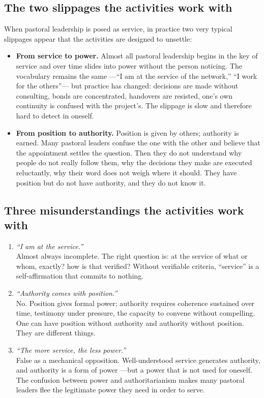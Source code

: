 \documentclass[11pt, a4paper]{article}
\begin{document}
\subsection*{The two slippages the activities work with}

When pastoral leadership is posed as service, in practice two very typical slippages appear that the activities are designed to unsettle:

\begin{itemize}
  \item \textbf{From service to power.} Almost all pastoral leadership begins in the key of service and over time slides into power without the person noticing. The vocabulary remains the same ---``I am at the service of the network,'' ``I work for the others''--- but practice has changed: decisions are made without consulting, bonds are concentrated, handovers are resisted, one's own continuity is confused with the project's. The slippage is slow and therefore hard to detect in oneself.
  \item \textbf{From position to authority.} Position is given by others; authority is earned. Many pastoral leaders confuse the one with the other and believe that the appointment settles the question. Then they do not understand why people do not really follow them, why the decisions they make are executed reluctantly, why their word does not weigh where it should. They have position but do not have authority, and they do not know it.
\end{itemize}

\subsection*{Three misunderstandings the activities work with}

\begin{enumerate}[label={\color{liderazgoVino}\arabic*.}]
  \item \emph{``I am at the service.''} \\
        Almost always incomplete. The right question is: at the service of what or whom, exactly? how is that verified? Without verifiable criteria, ``service'' is a self-affirmation that commits to nothing.
  \item \emph{``Authority comes with position.''} \\
        No. Position gives formal power; authority requires coherence sustained over time, testimony under pressure, the capacity to convene without compelling. One can have position without authority and authority without position. They are different things.
  \item \emph{``The more service, the less power.''} \\
        False as a mechanical opposition. Well-understood service generates authority, and authority is a form of power ---but a power that is not used for oneself. The confusion between power and authoritarianism makes many pastoral leaders flee the legitimate power they need in order to serve.
\end{enumerate}
\end{document}

